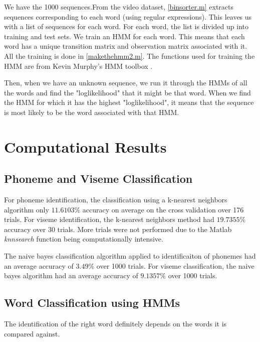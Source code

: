 \documentclass[a4paper,11pt]{article}
\begin{document}
We have the 1000 sequences.From the video dataset, \ref{binsorter.m} extracts sequences corresponding to each word (using regular expressions).
This leaves us with a list of sequences for each word. For each word, the list is divided up into training and test sets. We train an HMM for each word. This means that each word has a unique transition matrix and observation matrix associated with it. All the training is done in \ref{makethehmm2.m}. The functions used for training the HMM are from Kevin Murphy's HMM toolbox \cite{key-9}.

Then, when we have an unknown sequence, we run it through the HMMs of all the words and find the "loglikelihood" that it might be that word. When we find the HMM for which it has the highest "loglikelihood", it means that the sequence is most likely to be the word associated with that HMM.

\section{Computational Results}

\subsection{ Phoneme and Viseme Classification}
For phoneme identification, the classification using a k-nearest neighbors algorithm only $11.6103\%$ accuracy on average on the cross validation over 176 trials.  For viseme identification, the k-nearest neighbors method had $19.7355\%$ accuracy over 30 trials.  More trials were not performed due to the Matlab {\it knnsearch} function being computationally intensive.  

The naive bayes classification algorithm applied to identificaiton of phonemes had an average accuracy of $3.49\%$ over 1000 trials.  For viseme classification, the naive bayes algorithm had an average accuracy of $9.1357\%$ over 1000 trials. 

\subsection{Word Classification using HMMs}

The identification of the right word definitely depends on the words it is compared against.
\end{document}

